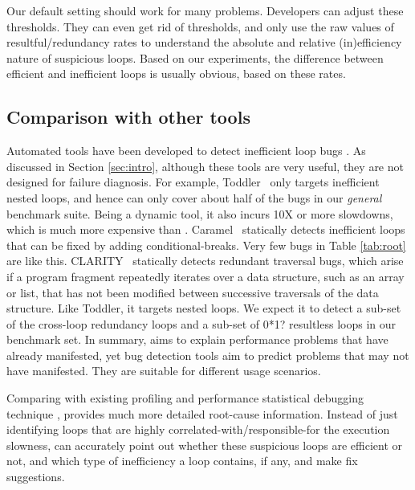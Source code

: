 Our default setting %
should work for many problems.
Developers can adjust these thresholds. 
They can even get rid of thresholds, and only
use the raw values of resultful/redundancy rates to understand
the absolute and relative (in)efficiency nature of suspicious 
loops. Based on our experiments, the difference between efficient and inefficient
loops is usually obvious, based on these rates.

\subsection{Comparison with other tools}

Automated tools have been developed to detect inefficient loop bugs
\cite{Alabama, CARAMEL, IsilDillig.PLDI15}. 
As discussed in Section \ref{sec:intro}, although these tools are very
useful, they are not designed for failure diagnosis. 
For example, Toddler~\cite{Alabama} only targets inefficient nested loops, and
hence can only cover about half of the bugs in our \emph{general} benchmark suite.
Being a dynamic tool, it also incurs 10X or more slowdowns, which is much more
expensive than \Tool. 
Caramel~\cite{CARAMEL} statically detects inefficient loops that can be fixed
by adding conditional-breaks. Very few bugs in Table \ref{tab:root} are like this.
CLARITY~\cite{IsilDillig.PLDI15} statically detects redundant traversal bugs, 
which arise if a program fragment repeatedly iterates over a data structure, such as an array or list, that has not been modified between successive traversals of the data structure.
Like Toddler, it targets nested loops.
We expect it to detect a sub-set of the cross-loop redundancy
loops and a sub-set of 0*1? resultless loops in our benchmark set.
In summary, \Tool aims to explain performance problems that have 
already manifested,
yet bug detection tools aim to predict problems that may not have manifested.
They are suitable for different usage scenarios.

Comparing with existing profiling and performance
statistical debugging technique \cite{SongOOPSLA2014}, \Tool provides much
more detailed root-cause information. Instead of just identifying loops that
are highly correlated-with/responsible-for the execution slowness, \Tool
can accurately point out whether these suspicious loops are efficient or not,
and which type of inefficiency a loop contains, if any, and make fix suggestions.
